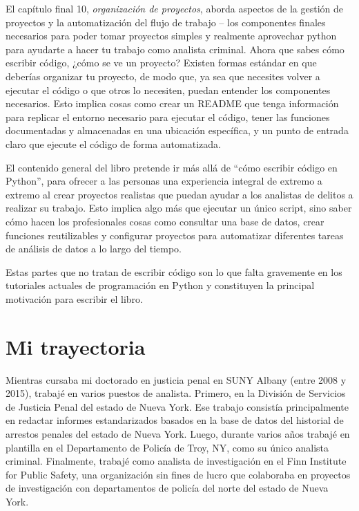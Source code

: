 \documentclass[
  letterpaper,
]{scrbook}
\begin{document}
El capítulo final 10, \emph{organización de proyectos}, aborda aspectos
de la gestión de proyectos y la automatización del flujo de trabajo --
los componentes finales necesarios para poder tomar proyectos simples y
realmente aprovechar python para ayudarte a hacer tu trabajo como
analista criminal. Ahora que sabes cómo escribir código, ¿cómo se ve un
proyecto? Existen formas estándar en que deberías organizar tu proyecto,
de modo que, ya sea que necesites volver a ejecutar el código o que
otros lo necesiten, puedan entender los componentes necesarios. Esto
implica cosas como crear un README que tenga información para replicar
el entorno necesario para ejecutar el código, tener las funciones
documentadas y almacenadas en una ubicación específica, y un punto de
entrada claro que ejecute el código de forma automatizada.

El contenido general del libro pretende ir más allá de ``cómo escribir
código en Python'', para ofrecer a las personas una experiencia integral
de extremo a extremo al crear proyectos realistas que puedan ayudar a
los analistas de delitos a realizar su trabajo. Esto implica algo más
que ejecutar un único script, sino saber cómo hacen los profesionales
cosas como consultar una base de datos, crear funciones reutilizables y
configurar proyectos para automatizar diferentes tareas de análisis de
datos a lo largo del tiempo.

Estas partes que no tratan de escribir código son lo que falta
gravemente en los tutoriales actuales de programación en Python y
constituyen la principal motivación para escribir el libro.

\section*{Mi trayectoria}\label{mi-trayectoria}


Mientras cursaba mi doctorado en justicia penal en SUNY Albany (entre
2008 y 2015), trabajé en varios puestos de analista. Primero, en la
División de Servicios de Justicia Penal del estado de Nueva York. Ese
trabajo consistía principalmente en redactar informes estandarizados
basados en la base de datos del historial de arrestos penales del estado
de Nueva York. Luego, durante varios años trabajé en plantilla en el
Departamento de Policía de Troy, NY, como su único analista criminal.
Finalmente, trabajé como analista de investigación en el Finn Institute
for Public Safety, una organización sin fines de lucro que colaboraba en
proyectos de investigación con departamentos de policía del norte del
estado de Nueva York.
\end{document}
